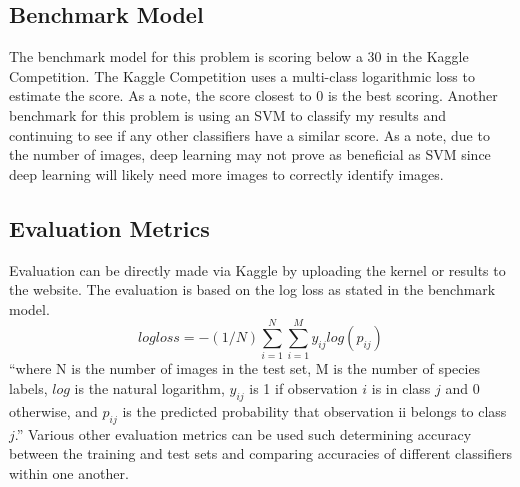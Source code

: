 \documentclass{article}
\begin{document}
\subsection{Benchmark Model}
The benchmark model for this problem is scoring below a 30 in the Kaggle Competition. The Kaggle Competition uses a multi-class logarithmic loss to estimate the score. As a note, the score closest to 0 is the best scoring. Another benchmark for this problem is using an SVM to classify my results and continuing to see if any other classifiers have a similar score. As a note, due to the number of images, deep learning may not prove as beneficial as SVM since deep learning will likely need more images to correctly identify images.

\subsection{Evaluation Metrics}
Evaluation can be directly made via Kaggle by uploading the kernel or results to the website. The evaluation is based on the log loss as stated in the benchmark model. 
\begin{equation}
logloss= -(1/N)\sum_{i=1}^{N}\sum_{i=1}^{M}y_{ij} log(p_{ij})
\end{equation}
 ``where N is the number of images in the test set, M is the number of species labels, $log$ is the natural logarithm, $y_{ij}$ is 1 if observation $i$ is in class $j$ and 0 otherwise, and $p_{ij}$ is the predicted probability that observation ii belongs to class $j$.'' Various other evaluation metrics can be used such determining accuracy between the training and test sets and comparing accuracies of different classifiers within one another. 
\end{document}
